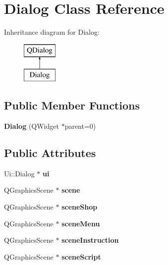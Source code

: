 \hypertarget{class_dialog}{\section{Dialog Class Reference}
\label{class_dialog}
}
Inheritance diagram for Dialog\-:\begin{figure}[H]
\begin{center}
\leavevmode
\includegraphics[height=2.000000cm]{class_dialog}
\end{center}
\end{figure}
\subsection*{Public Member Functions}
\begin{DoxyCompactItemize}
\item 
\hypertarget{class_dialog_acfa2063f9f962d394c6a645b6e7e08d8}{{\bfseries Dialog} (Q\-Widget $\ast$parent=0)}\label{class_dialog_acfa2063f9f962d394c6a645b6e7e08d8}

\end{DoxyCompactItemize}
\subsection*{Public Attributes}
\begin{DoxyCompactItemize}
\item 
\hypertarget{class_dialog_aaa4b5bfb9a0f64900d524f14bc32e6df}{Ui\-::\-Dialog $\ast$ {\bfseries ui}}\label{class_dialog_aaa4b5bfb9a0f64900d524f14bc32e6df}

\item 
\hypertarget{class_dialog_a2e726c6a62fa7cf2cec0d2a555b54593}{Q\-Graphics\-Scene $\ast$ {\bfseries scene}}\label{class_dialog_a2e726c6a62fa7cf2cec0d2a555b54593}

\item 
\hypertarget{class_dialog_a87becbd8566b731be26fbf8af7a02e00}{Q\-Graphics\-Scene $\ast$ {\bfseries scene\-Shop}}\label{class_dialog_a87becbd8566b731be26fbf8af7a02e00}

\item 
\hypertarget{class_dialog_a318f75a00c958a671a8306ce27dc4cbb}{Q\-Graphics\-Scene $\ast$ {\bfseries scene\-Menu}}\label{class_dialog_a318f75a00c958a671a8306ce27dc4cbb}

\item 
\hypertarget{class_dialog_a321fa4c0b6026f8ba8ae45b25ae6c5dc}{Q\-Graphics\-Scene $\ast$ {\bfseries scene\-Instruction}}\label{class_dialog_a321fa4c0b6026f8ba8ae45b25ae6c5dc}

\item 
\hypertarget{class_dialog_a1831f616ec83e8d5a3c1255e0a091c65}{Q\-Graphics\-Scene $\ast$ {\bfseries scene\-Script}}\label{class_dialog_a1831f616ec83e8d5a3c1255e0a091c65}

\end{DoxyCompactItemize}
